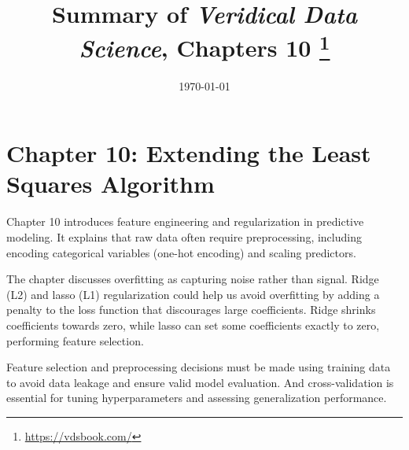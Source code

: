 \documentclass[letterpaper, 11pt]{article}
\title{\vspace{-1.5cm} Summary of \textit{Veridical Data Science}, Chapters 10 \footnote{\url{https://vdsbook.com/}}}
\date{\today}
\begin{document}
\hypersetup{colorlinks=true, linkcolor=blue, urlcolor=blue}
\maketitle

\section*{Chapter 10: Extending the Least Squares Algorithm}

Chapter 10 introduces feature engineering and regularization in predictive modeling.
It explains that raw data often require preprocessing, including encoding categorical variables (one-hot encoding) and scaling predictors.

The chapter discusses overfitting as capturing noise rather than signal.
Ridge (L2) and lasso (L1) regularization could help us avoid overfitting by adding a penalty to the loss function that discourages large coefficients.
Ridge shrinks coefficients towards zero, while lasso can set some coefficients exactly to zero, performing feature selection.

Feature selection and preprocessing decisions must be made using training data to avoid data leakage and ensure valid model evaluation.
And cross-validation is essential for tuning hyperparameters and assessing generalization performance.

\end{document}

